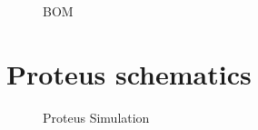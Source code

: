   \begin{figure}
  \noindent{}
  \caption{BOM}
\end{figure}

\newpage
\section{Proteus schematics}

  \begin{figure}[h]
  \noindent{}
  \caption{Proteus Simulation}
\end{figure}
\newpage

